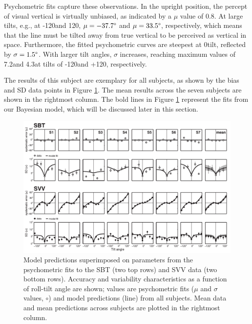 Psychometric fits capture these observations. In the upright position, the percept of visual vertical is virtually unbiased, as indicated by a $\mu$ value of 0.8\textdegree. At large tilts, e.g., at -120\mydegree and 120\textdegree, $\mu = -37.7\degree$ and $\mu = 33.5\degree$, respectively, which means that the line must be tilted away from true vertical to be perceived as vertical in space. Furthermore, the fitted psychometric curves are steepest at 0\mydegree tilt, reflected by $\sigma = 1.5\degree$. With larger tilt angles, $\sigma$ increases, reaching maximum values of 7.2\mydegree and 4.3\mydegree at tilts of -120\mydegree and +120\textdegree, respectively. 

The results of this subject are exemplary for all subjects, as shown by the bias and SD data points in Figure \ref{p1:fig4}. The mean results across the seven subjects are shown in the rightmost column. The bold lines in Figure \ref{p1:fig4} represent the fits from our Bayesian model, which will be discussed later in this section. 

\begin{figure}
	\includegraphics[width=1.0\textwidth]{src/paper1/figure4.pdf}
	
    \caption{Model predictions superimposed on parameters from the psychometric fits to the SBT (two top rows) and SVV data (two bottom rows). Accuracy and variability characteristics as a function of roll-tilt angle are shown; values are psychometric fits ($\mu$ and $\sigma$ values, $\circ$) and model predictions (line) from all subjects. Mean data and mean predictions across subjects are plotted in the rightmost column.}
    \label{p1:fig4}
\end{figure}


